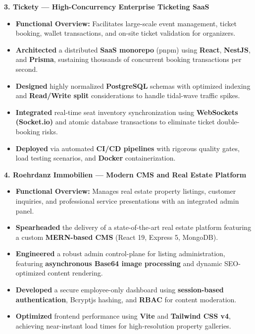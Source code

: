 \documentclass[10pt, letterpaper]{article}
\newenvironment{highlights}{
\begin{itemize}[leftmargin=12pt, itemsep=2pt]
}{
\end{itemize}
}
\begin{document}
\textbf{3. Tickety --- High-Concurrency Enterprise Ticketing SaaS}
\begin{highlights}
\item \textbf{Functional Overview:} Facilitates large-scale event management, ticket booking, wallet transactions, and on-site ticket validation for organizers.
\item \textbf{Architected} a distributed \textbf{SaaS monorepo} (pnpm) using \textbf{React}, \textbf{NestJS}, and \textbf{Prisma}, sustaining thousands of concurrent booking transactions per second.
\item \textbf{Designed} highly normalized \textbf{PostgreSQL} schemas with optimized indexing and \textbf{Read/Write split} considerations to handle tidal-wave traffic spikes.
\item \textbf{Integrated} real-time seat inventory synchronization using \textbf{WebSockets (Socket.io)} and atomic database transactions to eliminate ticket double-booking risks.
\item \textbf{Deployed} via automated \textbf{CI/CD pipelines} with rigorous quality gates, load testing scenarios, and \textbf{Docker} containerization.
\end{highlights}

\textbf{4. Roehrdanz Immobilien --- Modern CMS and Real Estate Platform}
\begin{highlights}
\item \textbf{Functional Overview:} Manages real estate property listings, customer inquiries, and professional service presentations with an integrated admin panel.
\item \textbf{Spearheaded} the delivery of a state-of-the-art real estate platform featuring a custom \textbf{MERN-based CMS} (React 19, Express 5, MongoDB).
\item \textbf{Engineered} a robust admin control-plane for listing administration, featuring \textbf{asynchronous Base64 image processing} and dynamic SEO-optimized content rendering.
\item \textbf{Developed} a secure employee-only dashboard using \textbf{session-based authentication}, Bcryptjs hashing, and \textbf{RBAC} for content moderation.
\item \textbf{Optimized} frontend performance using \textbf{Vite} and \textbf{Tailwind CSS v4}, achieving near-instant load times for high-resolution property galleries.
\end{highlights}
\end{document}
